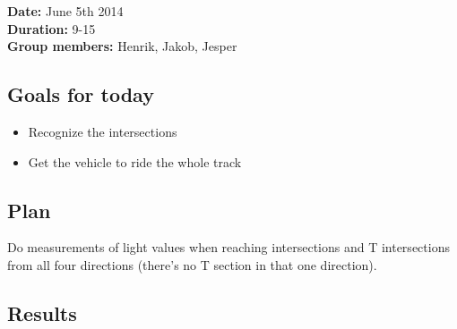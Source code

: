 \textbf{Date:} June 5th 2014\\\textbf{Duration:} 9-15\\\textbf{Group
members:} Henrik, Jakob, Jesper

\subsection{Goals for today}

\begin{itemize}
\itemsep1pt\parskip0pt
\item
  Recognize the intersections
\item
  Get the vehicle to ride the whole track
\end{itemize}

\subsection{Plan}

Do measurements of light values when reaching intersections and T
intersections from all four directions (there's no T section in that one
direction).

\subsection{Results}

